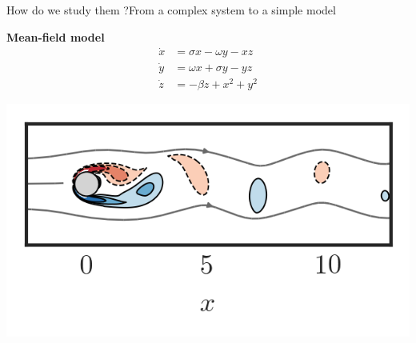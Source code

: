 \documentclass[usenames,dvipsnames,svgnames,10pt,aspectratio=169]{beamer}
\begin{document}
\begin{frame}[t, c]{How do we study them ?}{From a complex system to a simple model}
  \begin{minipage}{.38\textwidth}
    \centering
    \textbf{Mean-field model}
    \[
    \begin{aligned}
      \dot{x} & = \sigma x - \omega y - xz \\
      \dot{y} & = \omega x + \sigma y - yz \\
      \dot{z} & = -\beta z + x^2 + y^2
    \end{aligned}
    \]
  \end{minipage}%
  \hfill
  \begin{minipage}{.58\textwidth}
    \centering
    \includegraphics[width=\textwidth]{ground_truth_flow_field}
  \end{minipage}

  \vspace{1cm}
\end{frame}
\end{document}
